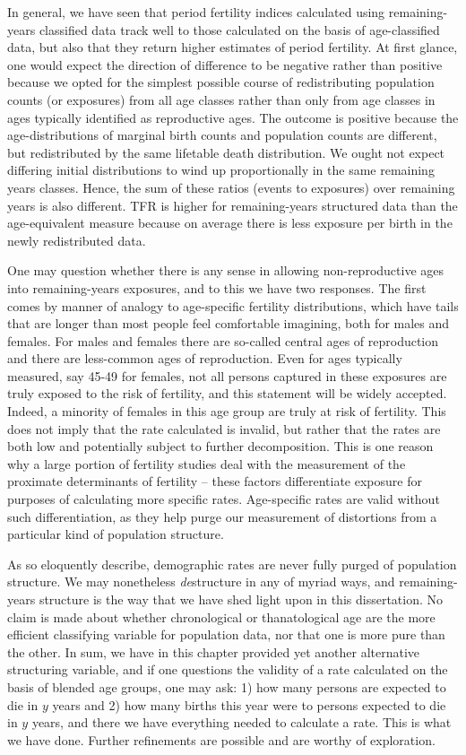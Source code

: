 In general, we have seen that period fertility indices calculated using
remaining-years classified data track well to those calculated on
the basis of age-classified data, but also that they return higher estimates of
period fertility. At first glance, one would expect the direction of difference to be negative 
rather than positive because we opted for the simplest possible course of
redistributing population counts (or exposures) from all age classes rather than
only from age classes in ages typically identified as reproductive ages. The
outcome is positive because the age-distributions of marginal birth counts and
population counts are different, but redistributed by the same lifetable death
distribution. We ought not expect differing initial distributions to wind up
proportionally in the same remaining years classes. Hence, the sum of these
ratios (events to exposures) over remaining years is also different. TFR is higher for remaining-years structured data than the age-equivalent
measure because on average there is less exposure per birth in the newly
redistributed data.

One may question whether there is any sense in allowing non-reproductive ages
into remaining-years exposures, and to this we have two responses. The first
comes by manner of analogy to age-specific fertility distributions, which
have tails that are longer than most people feel comfortable imagining, 
both for males and females. For males and
females there are so-called central ages of reproduction and there are
less-common ages of reproduction. Even for ages typically measured, say
45-49 for females, not all persons captured in these exposures are truly
exposed to the risk of fertility, and this statement will be widely accepted.
Indeed, a minority of females in this age group are truly at risk of fertility.
This does not imply that the rate calculated is invalid, but rather that the rates are both low and
potentially subject to further decomposition. This is one reason why a large
portion of fertility studies deal with the measurement of the proximate
determinants of fertility -- these factors differentiate exposure for purposes of calculating more specific rates.
Age-specific rates are valid without such differentiation, as they help purge
our measurement of distortions from a particular kind of population structure. 

As \citet{stolnitz1949recent} so eloquently describe, demographic rates are
never fully purged of population structure. We may nonetheless \textit{de}structure in
any of myriad ways, and remaining-years structure is the way that we have shed
light upon in this dissertation. No claim is made about whether chronological or
thanatological age are the more efficient classifying variable for population
data, nor that one is more pure than the other. In sum, we have in this
chapter provided yet another alternative structuring variable, and if one
questions the validity of a rate calculated on the basis of blended age groups,
one may ask: 1) how many persons are expected to die in $y$ years and 2) how
many births this year were to persons expected to die in $y$ years, and there we
have everything needed to calculate a rate. This is what we have done. Further
refinements are possible and are worthy of exploration.

